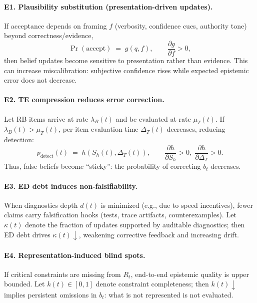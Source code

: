 \paragraph{E1. Plausibility substitution (presentation-driven updates).}
If acceptance depends on framing $f$ (verbosity, confidence cues, authority tone) beyond correctness/evidence,
\begin{equation}
\Pr(\text{accept}) \;=\; g(q,f), \qquad \frac{\partial g}{\partial f} > 0,
\label{eq:authority-inflation}
\end{equation}
then belief updates become sensitive to presentation rather than evidence. This can increase miscalibration: subjective confidence rises while expected epistemic error does not decrease.

\paragraph{E2. TE compression reduces error correction.}
Let RB items arrive at rate $\lambda_B(t)$ and be evaluated at rate $\mu_T(t)$.
If $\lambda_B(t)>\mu_T(t)$, per-item evaluation time $\Delta_T(t)$ decreases, reducing detection:
\begin{equation}
p_{\text{detect}}(t) \;=\; h\!\left(S_h(t),\Delta_T(t)\right), \qquad
\frac{\partial h}{\partial S_h} > 0,\; \frac{\partial h}{\partial \Delta_T} > 0.
\label{eq:detect}
\end{equation}
Thus, false beliefs become ``sticky'': the probability of correcting $b_t$ decreases.

\paragraph{E3. ED debt induces non-falsifiability.}
When diagnostics depth $d(t)$ is minimized (e.g., due to speed incentives), fewer claims carry falsification hooks (tests, trace artifacts, counterexamples). Let $\kappa(t)$ denote the fraction of updates supported by auditable diagnostics; then ED debt drives $\kappa(t)\downarrow$, weakening corrective feedback and increasing drift.

\paragraph{E4. Representation-induced blind spots.}
If critical constraints are missing from $R_t$, end-to-end epistemic quality is upper bounded. Let $k(t)\in[0,1]$ denote constraint completeness; then $k(t)\downarrow$ implies persistent omissions in $b_t$: what is not represented is not evaluated.

